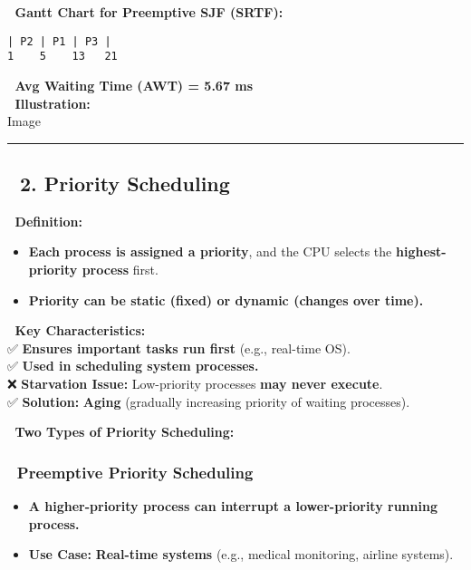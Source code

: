 \documentclass[
]{article}
\providecommand{\tightlist}{%
  \setlength{\itemsep}{0pt}\setlength{\parskip}{0pt}}
\begin{document}
📌 \textbf{Gantt Chart for Preemptive SJF (SRTF):}

\begin{verbatim}
| P2 | P1 | P3 |
1    5    13   21
\end{verbatim}

📌 \textbf{Avg Waiting Time (AWT) = 5.67 ms}\\
📌 \textbf{Illustration:}\\
{Image}

\begin{center}\rule{0.5\linewidth}{0.5pt}\end{center}

\subsection{\texorpdfstring{\textbf{📌 2. Priority
Scheduling}}{📌 2. Priority Scheduling}}\label{priority-scheduling}

📌 \textbf{Definition:}

\begin{itemize}
\tightlist
\item
  \textbf{Each process is assigned a priority}, and the CPU selects the
  \textbf{highest-priority process} first.
\item
  \textbf{Priority can be static (fixed) or dynamic (changes over
  time).}
\end{itemize}

📌 \textbf{Key Characteristics:}\\
✅ \textbf{Ensures important tasks run first} (e.g., real-time OS).\\
✅ \textbf{Used in scheduling system processes.}\\
❌ \textbf{Starvation Issue:} Low-priority processes \textbf{may never
execute}.\\
✅ \textbf{Solution:} \textbf{Aging} (gradually increasing priority of
waiting processes).

📌 \textbf{Two Types of Priority Scheduling:}

\subsubsection{\texorpdfstring{\textbf{🔹 Preemptive Priority
Scheduling}}{🔹 Preemptive Priority Scheduling}}\label{preemptive-priority-scheduling}

\begin{itemize}
\tightlist
\item
  \textbf{A higher-priority process can interrupt a lower-priority
  running process.}
\item
  \textbf{Use Case:} \textbf{Real-time systems} (e.g., medical
  monitoring, airline systems).
\end{itemize}
\end{document}
